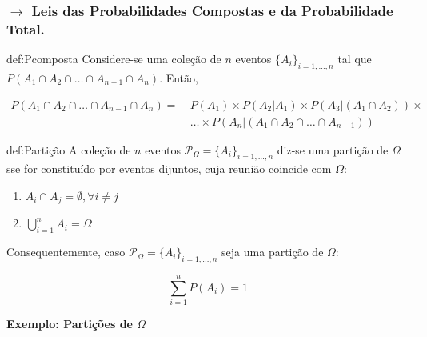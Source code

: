 \subsubsection[1.2.1 Leis das Probabilidades Compostas e da Probabilidade Total.]{$\pmb{\rightarrow}$ Leis das Probabilidades Compostas e da Probabilidade Total.}

\begin{theo}{def:Pcomposta}\label{def:Pcomposta}
    Considere-se uma coleção de $n$ eventos $\{A_i\}_{i=1,\dots,n}$ tal que $P(A_1 \cap A_2 \cap \dots \cap A_{n-1} \cap A_n)$. Então,
    
    \vspace{-1 em}
    \begin{align*}
        P(A_1 \cap A_2 \cap \dots \cap A_{n-1} \cap A_n) =\: &P(A_1) \times P(A_2|A_1) \times P(A_3 | (A_1 \cap A_2)) \times \\
       &\dots  \times P(A_n | (A_1 \cap A_2 \cap \dots \cap A_{n - 1}))
    \end{align*}
\end{theo}

\begin{theo}{def:Partição}\label{def:Partição}
    A coleção de $n$ eventos $\mathcal{P}_\Omega = \{A_i\}_{i=1,\dots,n}$ diz-se uma partição de $\Omega$ sse for constituído por eventos dijuntos, cuja reunião coincide com $\Omega$:
    
    \vspace{-1em}
    \begin{enumerate}[label=$\bullet$]
        \item $A_i \cap A_j = \emptyset, \forall i \neq j$
        \item $\bigcup_{i=1}^{n} A_i = \Omega$
    \end{enumerate}

   \noindent Consequentemente, caso $\mathcal{P}_\Omega = \{A_i\}_{i=1,\dots,n}$ seja uma partição de $\Omega$:

    \vspace{-0.75em}
    $$
        \sum_{i = 1}^{n} P(A_i) = 1
    $$
\end{theo}

\newpage
\noindent \textbf{Exemplo: Partições de $\Omega$}

